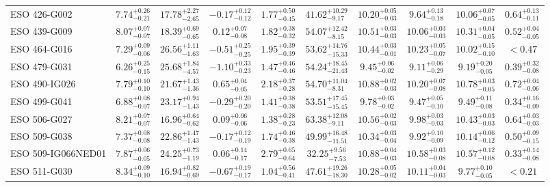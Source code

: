 \documentclass[onecolumn]{mn2e}
\begin{document}
\begin{landscape}
{\begin{center}
\begin{longtable}{lccccccccc}
ESO 426-G002 & $7.74_{-0.21}^{+0.26}$ & $17.78_{-2.65}^{+2.27}$ & $-0.17_{-0.12}^{+0.12}$ & $1.77_{-0.45}^{+0.50}$ &$41.62_{-9.17}^{+10.29}$ & $10.20_{-0.03}^{+0.05}$ & $9.64_{-0.18}^{+0.13}$ & $10.06_{-0.05}^{+0.07}$ & $0.64_{-0.11}^{+0.13}$ \\
ESO 439-G009 & $8.07_{-0.07}^{+0.07}$ & $18.39_{-0.65}^{+0.69}$ & $0.12_{-0.08}^{+0.07}$ & $1.82_{-0.32}^{+0.38}$ &$54.07_{-8.15}^{+12.42}$ & $10.51_{-0.03}^{+0.03}$ & $10.06_{-0.03}^{+0.03}$ & $10.31_{-0.05}^{+0.04}$ & $0.52_{-0.05}^{+0.04}$ \\
ESO 464-G016 & $7.29_{-0.06}^{+0.09}$ & $26.56_{-1.63}^{+1.11}$ & $-0.51_{-0.25}^{+0.25}$ & $1.95_{-0.39}^{+0.39}$ &$53.62_{-15.33}^{+14.76}$ & $10.44_{-0.01}^{+0.03}$ & $10.23_{-0.07}^{+0.05}$ & $10.02_{-0.10}^{+0.15}$ & $<0.47$ \\
ESO 479-G031 & $6.26_{-0.15}^{+0.25}$ & $25.68_{-4.57}^{+1.84}$ & $-1.10_{-0.23}^{+0.33}$ & $1.47_{-0.46}^{+0.46}$ &$54.24_{-21.43}^{+18.45}$ & $9.45_{-0.02}^{+0.06}$ & $9.11_{-0.29}^{+0.06}$ & $9.19_{-0.05}^{+0.20}$ & $0.39_{-0.08}^{+0.32}$ \\
ESO 490-IG026 & $7.79_{-0.10}^{+0.10}$ & $21.67_{-1.36}^{+1.43}$ & $0.65_{-0.05}^{+0.04}$ & $2.18_{-0.28}^{+0.37}$ &$54.70_{-8.31}^{+11.04}$ & $10.88_{-0.03}^{+0.02}$ & $10.20_{-0.08}^{+0.07}$ & $10.78_{-0.05}^{+0.03}$ & $0.72_{-0.06}^{+0.04}$ \\
ESO 499-G041 & $6.88_{-0.07}^{+0.08}$ & $23.17_{-1.43}^{+0.94}$ & $-0.29_{-0.20}^{+0.20}$ & $1.41_{-0.38}^{+0.38}$ &$53.51_{-15.45}^{+17.45}$ & $9.78_{-0.02}^{+0.03}$ & $9.47_{-0.10}^{+0.05}$ & $9.49_{-0.08}^{+0.11}$ & $0.34_{-0.09}^{+0.16}$ \\
ESO 506-G027 & $8.21_{-0.07}^{+0.07}$ & $16.96_{-0.62}^{+0.64}$ & $0.09_{-0.06}^{+0.06}$ & $1.38_{-0.23}^{+0.28}$ &$63.38_{-9.11}^{+12.08}$ & $10.56_{-0.03}^{+0.02}$ & $9.98_{-0.03}^{+0.03}$ & $10.43_{-0.03}^{+0.03}$ & $0.64_{-0.03}^{+0.03}$ \\
ESO 509-G038 & $7.37_{-0.08}^{+0.08}$ & $22.86_{-1.43}^{+1.47}$ & $-0.17_{-0.19}^{+0.12}$ & $1.74_{-0.38}^{+0.46}$ &$49.99_{-11.51}^{+16.48}$ & $10.34_{-0.04}^{+0.03}$ & $9.92_{-0.09}^{+0.10}$ & $10.14_{-0.12}^{+0.06}$ & $0.50_{-0.15}^{+0.09}$ \\
ESO 509-IG066NED01 & $7.87_{-0.05}^{+0.06}$ & $24.25_{-1.19}^{+0.73}$ & $0.06_{-0.17}^{+0.14}$ & $2.79_{-0.64}^{+0.65}$ &$32.25_{-7.53}^{+9.56}$ & $10.88_{-0.03}^{+0.04}$ & $10.58_{-0.08}^{+0.03}$ & $10.57_{-0.08}^{+0.12}$ & $0.33_{-0.08}^{+0.14}$ \\
ESO 511-G030 & $8.34_{-0.10}^{+0.09}$ & $16.94_{-0.69}^{+0.82}$ & $-0.67_{-0.17}^{+0.19}$ & $1.04_{-0.41}^{+0.56}$ &$47.61_{-18.30}^{+19.26}$ & $10.28_{-0.02}^{+0.05}$ & $10.11_{-0.03}^{+0.04}$ & $9.77_{-0.05}^{+0.10}$ & $<0.21$ \\

\end{longtable}
\end{center}}
\end{landscape}
\end{document}
